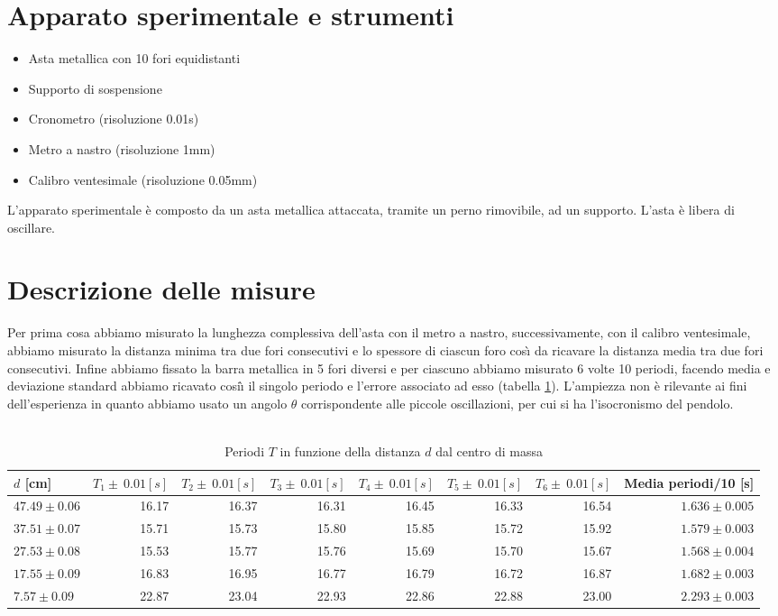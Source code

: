 \documentclass{article}
\begin{document}
		\section{Apparato sperimentale e strumenti}
			\begin{itemize}
				\item Asta metallica con 10 fori equidistanti
				\item Supporto di sospensione
				\item Cronometro (risoluzione 0.01s)
				\item Metro a nastro (risoluzione 1mm)
				\item Calibro ventesimale (risoluzione 0.05mm)
			\end{itemize}
			L'apparato sperimentale \`{e} composto da un asta metallica attaccata, tramite un perno rimovibile, ad un supporto. L'asta \`{e} libera di oscillare.
			
		\section{Descrizione delle misure}
			Per prima cosa abbiamo misurato la lunghezza complessiva dell'asta con il metro a nastro, successivamente, con il calibro ventesimale, abbiamo misurato la distanza minima tra due fori consecutivi e lo spessore di ciascun foro cos\`{\i} da ricavare la distanza media tra due fori consecutivi. Infine abbiamo fissato la barra metallica in 5 fori diversi e per ciascuno abbiamo misurato 6 volte 10 periodi, facendo media e deviazione standard abbiamo ricavato cosi\`{\i} il singolo periodo e l'errore associato ad esso (tabella \ref{tabella periodi distanza}). L'ampiezza non \`{e} rilevante ai fini dell'esperienza in quanto abbiamo usato un angolo $\theta$ corrispondente alle piccole oscillazioni, per cui si ha l'isocronismo del pendolo.
			\\\\
			\begin{table}
				\begin{adjustbox}{width=\textwidth}
					\begin{tabular}{lrrrrrrr}
						\centering
						$d$ [cm]&$T_1 \pm \:0.01[s]$&$T_2 \pm \:0.01[s]$&$T_3 \pm \: 0.01[s]$&$T_4 \pm \:0.01[s]$&$T_5 \pm \:0.01[s]$&$T_6 \pm \:0.01[s]$&Media periodi/10 [s]\\
						\hline
						\hline
						$47.49\pm0.06$&16.17&16.37&16.31&16.45&16.33&16.54&$1.636\pm0.005$\\
						$37.51\pm0.07$&15.71&15.73&15.80&15.85&15.72&15.92&$1.579\pm0.003$\\
						$27.53\pm0.08$&15.53&15.77&15.76&15.69&15.70&15.67&$1.568\pm0.004$\\
						$17.55\pm0.09$&16.83&16.95&16.77&16.79&16.72&16.87&$1.682\pm0.003$\\
						$7.57\pm0.09$&22.87&23.04&22.93&22.86&22.88&23.00&$2.293\pm0.003$\\
					\end{tabular}
				\end{adjustbox}
				\label{tabella periodi distanza}
				\caption{Periodi $T$ in funzione della distanza $d$ dal centro di massa}
			\end{table}
		
\end{document}
